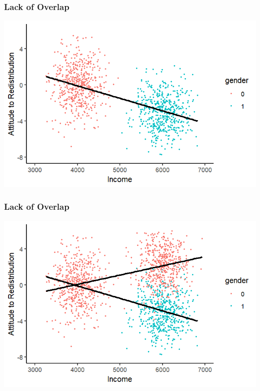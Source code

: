 \documentclass[xcolor=x11names,compress]{beamer}\usepackage[]{graphicx}\usepackage[]{color}
\makeatletter
\def\maxwidth{ %
  \ifdim\Gin@nat@width>\linewidth
    \linewidth
  \else
    \Gin@nat@width
  \fi
}
\newenvironment{knitrout}{}{} %
\renewcommand{\(}{\begin{columns}}
\renewcommand{\)}{\end{columns}}
\newcommand{\<}[1]{\begin{column}{#1}}
\renewcommand{\>}{\end{column}}
\makeatother
\begin{document}
\begin{frame}
\frametitle{Lack of Overlap}
\begin{knitrout}
\color{fgcolor}
\includegraphics[width=\maxwidth]{figure/overlap2-1} 

\end{knitrout}
\end{frame}

\begin{frame}
\frametitle{Lack of Overlap}
\begin{knitrout}
\color{fgcolor}
\includegraphics[width=\maxwidth]{figure/overlap3-1} 

\end{knitrout}
\end{frame}
\end{document}
